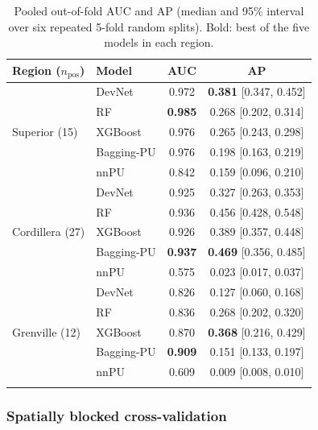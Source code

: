 \documentclass[pdflatex,sn-apa]{sn-jnl}
\begin{document}
\begin{table}[t]
\caption{Pooled out-of-fold AUC and AP (median and 95\% interval over six repeated 5-fold random splits). Bold: best of the five models in each region.}\label{tab:benchmark}
\footnotesize
\begin{tabular*}{\textwidth}{@{\extracolsep\fill}llcc}
\toprule
Region ($n_{\mathrm{pos}}$) & Model & AUC & AP \\
\midrule
\multirow{5}{*}{Superior (15)} & DevNet & 0.972 & \textbf{0.381} [0.347, 0.452] \\
 & RF & \textbf{0.985} & 0.268 [0.202, 0.314] \\
 & XGBoost & 0.976 & 0.265 [0.243, 0.298] \\
 & Bagging-PU & 0.976 & 0.198 [0.163, 0.219] \\
 & nnPU & 0.842 & 0.159 [0.096, 0.210] \\
\midrule
\multirow{5}{*}{Cordillera (27)} & DevNet & 0.925 & 0.327 [0.263, 0.353] \\
 & RF & 0.936 & 0.456 [0.428, 0.548] \\
 & XGBoost & 0.926 & 0.389 [0.357, 0.448] \\
 & Bagging-PU & \textbf{0.937} & \textbf{0.469} [0.356, 0.485] \\
 & nnPU & 0.575 & 0.023 [0.017, 0.037] \\
\midrule
\multirow{5}{*}{Grenville (12)} & DevNet & 0.826 & 0.127 [0.060, 0.168] \\
 & RF & 0.836 & 0.268 [0.202, 0.320] \\
 & XGBoost & 0.870 & \textbf{0.368} [0.216, 0.429] \\
 & Bagging-PU & \textbf{0.909} & 0.151 [0.133, 0.197] \\
 & nnPU & 0.609 & 0.009 [0.008, 0.010] \\
\botrule
\end{tabular*}
\end{table}

\subsubsection{Spatially blocked cross-validation}\label{sec:res-spatial}
\end{document}
